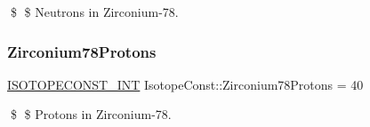 \$ \$ Neutrons in Zirconium-\/78. \mbox{\label{group___isotope_const-_zirconium-_zr78_ga1bafad9482c66d9319949a6b41672702}} 
\subsubsection{\texorpdfstring{Zirconium78\+Protons}{Zirconium78Protons}}
{\footnotesize\ttfamily \mbox{\hyperlink{group___isotope_const-_macros_ga5f18360b3e99483a35c32d789e62621c}{I\+S\+O\+T\+O\+P\+E\+C\+O\+N\+S\+T\+\_\+\+I\+NT}} Isotope\+Const\+::\+Zirconium78\+Protons = 40}

\$ \$ Protons in Zirconium-\/78. 